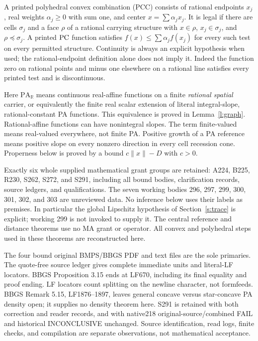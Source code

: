 \documentclass[11pt]{article}
\theoremstyle{definition}\newtheorem{definition}[theorem]{Definition}
\theoremstyle{remark}\newtheorem{remark}[theorem]{Remark}
\newcommand{\R}{\mathbb R}\newcommand{\Q}{\mathbb Q}
\newcommand{\PA}{\mathrm{PA}}\newcommand{\dist}{\operatorname{dist}}
\begin{document}
A printed polyhedral convex combination (PCC) consists of rational endpoints $x_j$, real weights $\alpha_j\geq0$ with sum one, and center $x=\sum\alpha_jx_j$. It is legal if there are cells $\sigma_j$ and a face $\rho$ of a rational carrying structure with $x\in\rho$, $x_j\in\sigma_j$, and $\rho\preceq\sigma_j$. A printed $\mathrm{PC}$ function satisfies $f(x)\leq\sum\alpha_j f(x_j)$ for every such test on every permitted structure. Continuity is always an explicit hypothesis when used; the rational-endpoint definition alone does not imply it. Indeed the function zero on rational points and minus one elsewhere on a rational line satisfies every printed test and is discontinuous.

Here $\PA_{\R}$ means continuous real-affine functions on a finite \emph{rational spatial} carrier, or equivalently the finite real scalar extension of literal integral-slope, rational-constant PA functions. This equivalence is proved in Lemma~\ref{l:graph}. Rational-affine functions can have nonintegral slopes. The term finite-valued means real-valued everywhere, not finite PA. Positive growth of a PA reference means positive slope on every nonzero direction in every cell recession cone. Properness below is proved by a bound $c\|x\|-D$ with $c>0$.

Exactly six whole supplied mathematical grant groups are retained: A224, B225, R230, S262, S272, and S291, including all bound bodies, clarification records, source ledgers, and qualifications. The seven working bodies 296, 297, 299, 300, 301, 302, and 303 are unreviewed data. No inference below uses their labels as premises. In particular the global Lipschitz hypothesis of Section~\ref{s:trace} is explicit; working 299 is not invoked to supply it. The central reference and distance theorems use no MA grant or operator. All convex and polyhedral steps used in these theorems are reconstructed here.

The four bound original BMPS/BBGS PDF and text files are the sole primaries. The quote-free source ledger gives complete immediate units and literal-LF locators. BBGS Proposition 3.15 ends at LF670, including its final equality and proof ending. LF locators count splitting on the newline character, not formfeeds. BBGS Remark 5.15, LF1876--1897, leaves general concave versus star-concave PA density open; it supplies no density theorem here. S291 is retained with both correction and reader records, and with native218 original-source/combined FAIL and historical INCONCLUSIVE unchanged. Source identification, read logs, finite checks, and compilation are separate observations, not mathematical acceptance.
\end{document}
